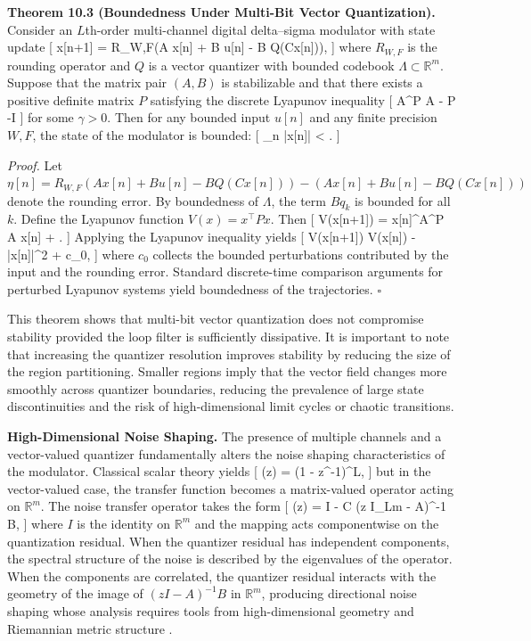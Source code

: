 \medskip

\textbf{Theorem 10.3 (Boundedness Under Multi-Bit Vector Quantization).}
Consider an $L$th-order multi-channel digital delta–sigma modulator with state update
[
x[n+1] = R_{W,F}(A x[n] + B u[n] - B Q(Cx[n])),
]
where $R_{W,F}$ is the rounding operator and $Q$ is a vector quantizer with bounded codebook $\Lambda \subset \mathbb{R}^{m}$. Suppose that the matrix pair $(A,B)$ is stabilizable and that there exists a positive definite matrix $P$ satisfying the discrete Lyapunov inequality
[
A^\top P A - P \preceq -\gamma I
]
for some $\gamma > 0$. Then for any bounded input $u[n]$ and any finite precision $W,F$, the state of the modulator is bounded:
[
\sup_{n } |x[n]| < \infty.
]

\textit{Proof.}
Let $\eta[n] = R_{W,F}(A x[n] + B u[n] - B Q(Cx[n])) - (A x[n] + B u[n] - B Q(Cx[n]))$ denote the rounding error. By boundedness of $\Lambda$, the term $B q_{k}$ is bounded for all $k$. Define the Lyapunov function $V(x)=x^\top P x$. Then
[
V(x[n+1]) = x[n]^\top A^\top P A x[n] + .
]
Applying the Lyapunov inequality yields
[
V(x[n+1]) \le V(x[n]) - \gamma |x[n]|^{2} + c_{0},
]
where $c_{0}$ collects the bounded perturbations contributed by the input and the rounding error. Standard discrete-time comparison arguments for perturbed Lyapunov systems \cite{khalil2002nonlinear} yield boundedness of the trajectories. \hfill $\square$

\medskip

This theorem shows that multi-bit vector quantization does not compromise stability provided the loop filter is sufficiently dissipative. It is important to note that increasing the quantizer resolution improves stability by reducing the size of the region partitioning. Smaller regions imply that the vector field changes more smoothly across quantizer boundaries, reducing the prevalence of large state discontinuities and the risk of high-dimensional limit cycles or chaotic transitions.

\medskip

\textbf{High-Dimensional Noise Shaping.}
The presence of multiple channels and a vector-valued quantizer fundamentally alters the noise shaping characteristics of the modulator. Classical scalar theory yields
[
(z) = (1 - z^{-1})^{L},
]
but in the vector-valued case, the transfer function becomes a matrix-valued operator acting on $\mathbb{R}^{m}$. The noise transfer operator takes the form
[
(z) = I - C (z I_{Lm} - A)^{-1} B,
]
where $I$ is the identity on $\mathbb{R}^{m}$ and the mapping acts componentwise on the quantization residual. When the quantizer residual has independent components, the spectral structure of the noise is described by the eigenvalues of the operator. When the components are correlated, the quantizer residual interacts with the geometry of the image of $(z I - A)^{-1} B$ in $\mathbb{R}^{m}$, producing directional noise shaping whose analysis requires tools from high-dimensional geometry and Riemannian metric structure \cite{amari2016informationgeometry, lee2013smoothmanifolds}.

